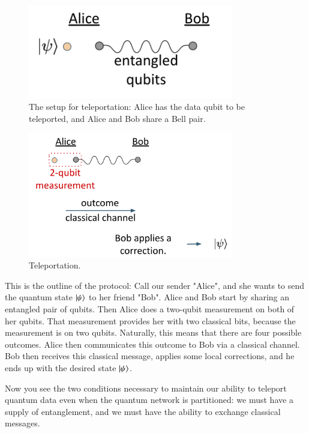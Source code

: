 \begin{figure}[H]
    \centering
    \includegraphics[width=0.8\textwidth]{lesson8/teleportation-setup.png}
        \caption{The setup for teleportation: Alice has the data qubit to be teleported, and Alice and Bob share a Bell pair.}
    \label{fig:teleportation-setup}
\end{figure}

\begin{figure}[H]
    \centering
    \includegraphics[width=0.8\textwidth]{lesson8/teleportation.png}
        \caption{Teleportation.}
    \label{fig:teleportation}
\end{figure}

This is the outline of the protocol: Call our sender "Alice", and she wants to send the quantum state $\left| \psi \right\rangle$ to her friend "Bob".  Alice and Bob start by sharing an entangled pair of qubits. Then Alice does a two-qubit measurement on both of her qubits. That measurement provides her with two classical bits, because the measurement is on two qubits.  Naturally, this means that there are four possible outcomes. Alice then communicates this outcome to Bob via a classical channel.  Bob then receives this classical message, applies some local corrections, and he ends up with the desired state $\left| \psi \right\rangle$. 

Now you see the two conditions necessary to maintain our ability to teleport quantum data even when the quantum network is partitioned: we must have a supply of entanglement, and we must have the ability to exchange classical messages.

